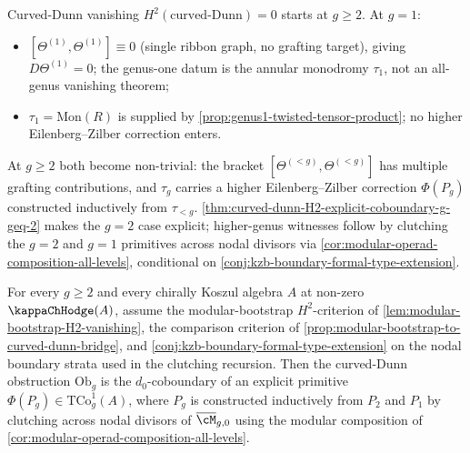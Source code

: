 \begin{remark}
\label{rem:genuine-starting-genus-g2}
Curved-Dunn vanishing \(H^{2}(\text{curved-Dunn}) = 0\) starts at
\(g \ge 2\). At \(g = 1\):
\begin{itemize}
\item \([\Theta^{(1)}, \Theta^{(1)}] \equiv 0\) (single ribbon
 graph, no grafting target), giving \(D\Theta^{(1)} = 0\); the
 genus-one datum is the annular monodromy \(\tau_{1}\), not an
 all-genus vanishing theorem;
\item \(\tau_{1} = \mathrm{Mon}(R)\) is supplied by
 \autoref{prop:genus1-twisted-tensor-product}; no higher
 Eilenberg--Zilber correction enters.
\end{itemize}
At \(g \ge 2\) both become non-trivial: the bracket
\([\Theta^{(<g)}, \Theta^{(<g)}]\) has multiple grafting
contributions, and \(\tau_{g}\) carries a higher Eilenberg--Zilber
correction \(\Phi(P_{g})\) constructed inductively from
\(\tau_{<g}\). \autoref{thm:curved-dunn-H2-explicit-coboundary-g-geq-2}
makes the \(g = 2\) case explicit; higher-genus witnesses follow
by clutching the \(g = 2\) and \(g = 1\) primitives across nodal
divisors via
\autoref{cor:modular-operad-composition-all-levels}, conditional
on \autoref{conj:kzb-boundary-formal-type-extension}.
\end{remark}

\begin{corollary}
\label{cor:curved-dunn-H2-explicit-all-g}
\ClaimStatusConditional
For every \(g \ge 2\) and every chirally Koszul algebra \(A\) at
non-zero \(\kappaChHodge(A)\), assume the modular-bootstrap
\(H^{2}\)-criterion of
\autoref{lem:modular-bootstrap-H2-vanishing}, the comparison
criterion of
\autoref{prop:modular-bootstrap-to-curved-dunn-bridge}, and
\autoref{conj:kzb-boundary-formal-type-extension} on the nodal
boundary strata used in the clutching recursion. Then the
curved-Dunn obstruction
\(\mathrm{Ob}_{g}\) is the \(d_{0}\)-coboundary of an explicit
primitive
\(\Phi(P_{g}) \in \mathrm{TCo}^{1}_{g}(A)\), where \(P_{g}\) is
constructed inductively from \(P_{2}\) and \(P_{1}\) by clutching
across nodal divisors of \(\overline{\cM}_{g, 0}\) using the
modular composition of
\autoref{cor:modular-operad-composition-all-levels}.
\end{corollary}

